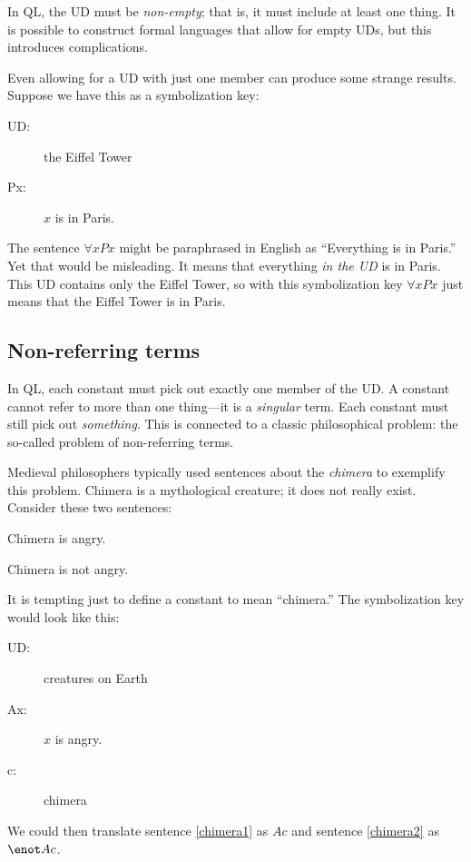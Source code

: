 In QL, the UD must be \emph{non-empty}; that is, it must include at least one thing. It is possible to construct formal languages that allow for empty UDs, but this introduces complications.

Even allowing for a UD with just one member can produce some strange results. Suppose we have this as a symbolization key:
\begin{description}
\item[UD:] the Eiffel Tower
\item[Px:] $x$ is in Paris.
\end{description}
The sentence $\forall x Px$ might be paraphrased in English as ``Everything is in Paris.'' Yet that would be misleading. It means that everything \emph{in the UD} is in Paris. This UD contains only the Eiffel Tower, so with this symbolization key $\forall x Px$ just means that the Eiffel Tower is in Paris.

\subsection{Non-referring terms}

In QL, each constant must pick out exactly one member of the UD. A constant cannot refer to more than one thing---it is a \emph{singular} term. Each constant must still pick out \emph{something}. This is connected to a classic philosophical problem: the so-called problem of non-referring terms.

Medieval philosophers typically used sentences about the \emph{chimera} to exemplify this problem. Chimera is a mythological creature; it does not really exist. Consider these two sentences:
\begin{kormanize}
\item[\ex{chimera1}] Chimera is angry.
\item[\ex{chimera2}] Chimera is not angry.
\end{kormanize}
It is tempting just to define a constant to mean ``chimera.'' The symbolization key would look like this:
\begin{description}
\item[UD:] creatures on Earth
\item[Ax:] $x$ is angry.
\item[c:] chimera
\end{description}
We could then translate sentence \ref{chimera1} as $Ac$ and sentence \ref{chimera2} as $\enot Ac$.

